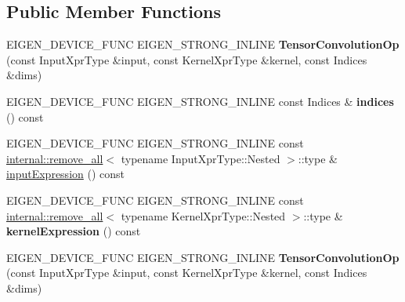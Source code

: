 \subsection*{Public Member Functions}
\begin{DoxyCompactItemize}
\item 
\mbox{\label{class_eigen_1_1_tensor_convolution_op_a6ed9f0e327b120147ffd3ab0c8460108}} 
E\+I\+G\+E\+N\+\_\+\+D\+E\+V\+I\+C\+E\+\_\+\+F\+U\+NC E\+I\+G\+E\+N\+\_\+\+S\+T\+R\+O\+N\+G\+\_\+\+I\+N\+L\+I\+NE {\bfseries Tensor\+Convolution\+Op} (const Input\+Xpr\+Type \&input, const Kernel\+Xpr\+Type \&kernel, const Indices \&dims)
\item 
\mbox{\label{class_eigen_1_1_tensor_convolution_op_ab251d300269e552d04628a72408a1292}} 
E\+I\+G\+E\+N\+\_\+\+D\+E\+V\+I\+C\+E\+\_\+\+F\+U\+NC E\+I\+G\+E\+N\+\_\+\+S\+T\+R\+O\+N\+G\+\_\+\+I\+N\+L\+I\+NE const Indices \& {\bfseries indices} () const
\item 
E\+I\+G\+E\+N\+\_\+\+D\+E\+V\+I\+C\+E\+\_\+\+F\+U\+NC E\+I\+G\+E\+N\+\_\+\+S\+T\+R\+O\+N\+G\+\_\+\+I\+N\+L\+I\+NE const \hyperlink{struct_eigen_1_1internal_1_1remove__all}{internal\+::remove\+\_\+all}$<$ typename Input\+Xpr\+Type\+::\+Nested $>$\+::type \& \hyperlink{class_eigen_1_1_tensor_convolution_op_a57097fbe6e0a033d587e98654f0bd664}{input\+Expression} () const
\item 
\mbox{\label{class_eigen_1_1_tensor_convolution_op_aeba694de8119c33273e368ef85eb77c3}} 
E\+I\+G\+E\+N\+\_\+\+D\+E\+V\+I\+C\+E\+\_\+\+F\+U\+NC E\+I\+G\+E\+N\+\_\+\+S\+T\+R\+O\+N\+G\+\_\+\+I\+N\+L\+I\+NE const \hyperlink{struct_eigen_1_1internal_1_1remove__all}{internal\+::remove\+\_\+all}$<$ typename Kernel\+Xpr\+Type\+::\+Nested $>$\+::type \& {\bfseries kernel\+Expression} () const
\item 
\mbox{\label{class_eigen_1_1_tensor_convolution_op_a6ed9f0e327b120147ffd3ab0c8460108}} 
E\+I\+G\+E\+N\+\_\+\+D\+E\+V\+I\+C\+E\+\_\+\+F\+U\+NC E\+I\+G\+E\+N\+\_\+\+S\+T\+R\+O\+N\+G\+\_\+\+I\+N\+L\+I\+NE {\bfseries Tensor\+Convolution\+Op} (const Input\+Xpr\+Type \&input, const Kernel\+Xpr\+Type \&kernel, const Indices \&dims)
\item 
\mbox{\label{class_eigen_1_1_tensor_convolution_op_ab251d300269e552d04628a72408a1292}} 

\end{DoxyCompactItemize}
